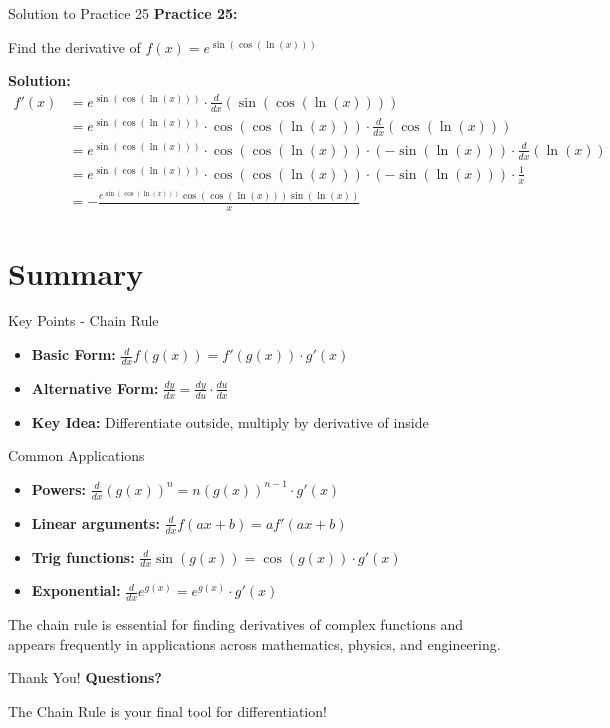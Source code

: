 \documentclass[aspectratio=169]{beamer}
\begin{document}
\begin{frame}{Solution to Practice 25}
\textbf{Practice 25:}

Find the derivative of $f(x) = e^{\sin(\cos(\ln(x)))}$

\textbf{Solution:}
\[
\begin{aligned}
  f'(x) &= e^{\sin(\cos(\ln(x)))} \cdot \frac{d}{dx}(\sin(\cos(\ln(x)))) \\
  &= e^{\sin(\cos(\ln(x)))} \cdot \cos(\cos(\ln(x))) \cdot \frac{d}{dx}(\cos(\ln(x))) \\
  &= e^{\sin(\cos(\ln(x)))} \cdot \cos(\cos(\ln(x))) \cdot (-\sin(\ln(x))) \cdot \frac{d}{dx}(\ln(x)) \\
  &= e^{\sin(\cos(\ln(x)))} \cdot \cos(\cos(\ln(x))) \cdot (-\sin(\ln(x))) \cdot \frac{1}{x} \\
  &= -\frac{e^{\sin(\cos(\ln(x)))}\cos(\cos(\ln(x)))\sin(\ln(x))}{x}
\end{aligned}
\]
\end{frame}

\section{Summary}

\begin{frame}{Key Points - Chain Rule}
\begin{itemize}
    \item \textbf{Basic Form:} $\frac{d}{dx}f(g(x)) = f'(g(x)) \cdot g'(x)$
    \item \textbf{Alternative Form:} $\frac{dy}{dx} = \frac{dy}{du} \cdot \frac{du}{dx}$
    \item \textbf{Key Idea:} Differentiate outside, multiply by derivative of inside
\end{itemize}
\end{frame}

\begin{frame}{Common Applications}
\begin{itemize}
    \item \textbf{Powers:} $\frac{d}{dx}(g(x))^n = n(g(x))^{n-1} \cdot g'(x)$
    \item \textbf{Linear arguments:} $\frac{d}{dx}f(ax + b) = a f'(ax + b)$
    \item \textbf{Trig functions:} $\frac{d}{dx}\sin(g(x)) = \cos(g(x)) \cdot g'(x)$
    \item \textbf{Exponential:} $\frac{d}{dx}e^{g(x)} = e^{g(x)} \cdot g'(x)$
\end{itemize}

\vspace{0.5cm}
The chain rule is essential for finding derivatives of complex functions and appears frequently in applications across mathematics, physics, and engineering.
\end{frame}

\begin{frame}{Thank You!}
\centering
\vspace{2cm}
{\Huge \textcolor{myblue}{\textbf{Questions?}}}

\vspace{1cm}
{\Large The Chain Rule is your final tool for differentiation!}
\end{frame}
\end{document}

